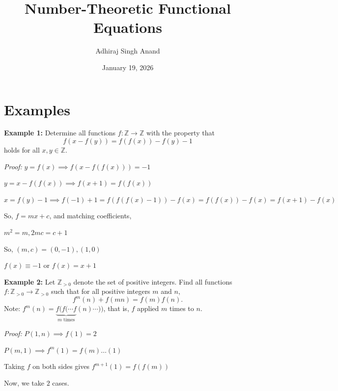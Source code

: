 \documentclass[10pt,letterpaper]{article}
\title{Number-Theoretic Functional Equations}
\author{Adhiraj Singh Anand}
\date{January 19, 2026}
\begin{document}
\maketitle
\section{Examples}
\begin{tcolorbox}[breakable,title={IMO Shortlist 2015 A2},colbacktitle=black!4,coltitle=black,fonttitle=\normalfont]
\textbf{Example 1:} Determine all functions $f:\mathbb{Z}\rightarrow\mathbb{Z}$ with the property that
\[f(x-f(y))=f(f(x))-f(y)-1\]
holds for all $x,y\in\mathbb{Z}$.
\end{tcolorbox}
\textit{Proof:}
$y=f(x)\implies f(x-f(f(x)))=-1$

$y=x-f(f(x))\implies f(x+1)=f(f(x))$

$x=f(y)-1\implies f(-1)+1=f(f(f(x)-1))-f(x)=f(f(x))-f(x)=f(x+1)-f(x)$

So, $f=mx+c$, and matching coefficients,

$m^2=m, 2mc=c+1$

So, $(m,c)=(0,-1),(1,0)$

$f(x) \equiv -1$ or $f(x)=x+1$
\par{}
\par

\par\vspace{12pt}
\begin{tcolorbox}[breakable,title={ELMO 2025 P1},colbacktitle=black!4,coltitle=black,fonttitle=\normalfont]
\textbf{Example 2:} Let $\mathbb{Z}_{>0}$ denote the set of positive integers. Find all functions $f \colon \mathbb{Z}_{>0} \to \mathbb{Z}_{>0}$ such that for all positive integers $m$ and $n$,
\[f^m(n)+f(mn)=f(m)f(n).\]
Note: $f^m(n)=\underbrace{f(f(\cdots f}_{m\text{ times}}(n)\cdots))$, that is, $f$ applied $m$ times to $n$.
\end{tcolorbox}
\textit{Proof:}
$P(1,n)\implies f(1)=2$

$P(m,1)\implies f^m(1)=f(m)\dots(1)$

Taking $f$ on both sides gives $f^{m+1}(1)=f(f(m))$

Now, we take $2$ cases.
\end{document}
